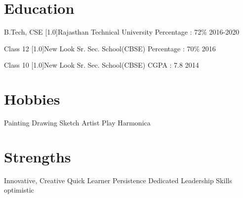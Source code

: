\documentclass[espanol]{cv-style}     %
\begin{document}
\section{Education}
  \vspace{-0.1cm}
\begin{entrylist}

\vspace{0.2cm}
\entrythree
  {B.Tech, CSE}
  {\scalebox{1}[1.0]{Rajasthan Technical University}}
  {Percentage : 72\%}
  {2016-2020}

\vspace{0.3cm}
\entrythree
  {Class 12}
  {\scalebox{1}[1.0]{New Look Sr. Sec. School(CBSE)}}
  {Percentage : 70\%}
  {2016}
  
\vspace{0.3cm}
\entrythree
  {Class 10}
  {\scalebox{1}[1.0]{New Look Sr. Sec. School(CBSE)}}
  {CGPA : 7.8}
  {2014}

\end{entrylist}



\begin{aside}
%
\vspace{-0.9cm}
\section{Hobbies}
Painting
Drawing
Sketch Artist
Play Harmonica
%
\section{Strengths}
Innovative,
Creative
Quick Learner
Persistence
Dedicated
Leadership Skills
optimistic
%
\end{aside}
\end{document}
